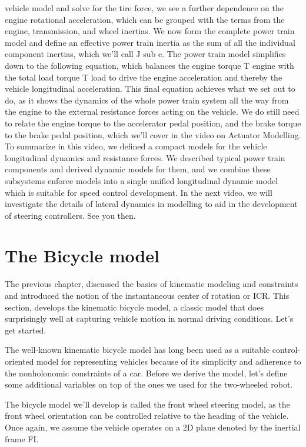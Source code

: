 vehicle model and solve for the tire force, we see a further dependence on the engine rotational acceleration, which can be grouped with the terms from the engine, transmission, and wheel inertias. We now form the complete power train model and define an effective power train inertia as the sum of all the individual component inertias, which we'll call J sub e. The power train model simplifies down to the following equation, which balances the engine torque T engine with the total load torque T load to drive the engine acceleration and thereby the vehicle longitudinal acceleration. This final equation achieves what we set out to do, as it shows the dynamics of the whole power train system all the way from the engine to the external resistance forces acting on the vehicle. We do still need to relate the engine torque to the accelerator pedal position, and the brake torque to the brake pedal position, which we'll cover in the video on Actuator Modelling. To summarize in this video, we defined a compact models for the vehicle longitudinal dynamics and resistance forces. We described typical power train components and derived dynamic models for them, and we combine these subsystems enforce models into a single unified longitudinal dynamic model which is suitable for speed control development. In the next video, we will investigate the details of lateral dynamics in modelling to aid in the development of steering controllers. See you then.

\section{The Bicycle model}

The previous chapter, discussed the basics of kinematic modeling and constraints and introduced the notion of the instantaneous center of rotation or ICR. 
This section, develops the kinematic bicycle model, a classic model that does surprisingly well at capturing vehicle motion in normal driving conditions. Let's get started. 


The well-known kinematic bicycle model has long been used as a suitable control-oriented model for representing vehicles because of its simplicity and adherence to the nonholonomic constraints of a car. Before we derive the model, let's define some additional variables on top of the ones we used for the two-wheeled robot. 


The bicycle model we'll develop is called the front wheel steering model, as the front wheel orientation can be controlled relative to the heading of the vehicle. 
Once again, we assume the vehicle operates on a 2D plane denoted by the inertial frame FI. 

